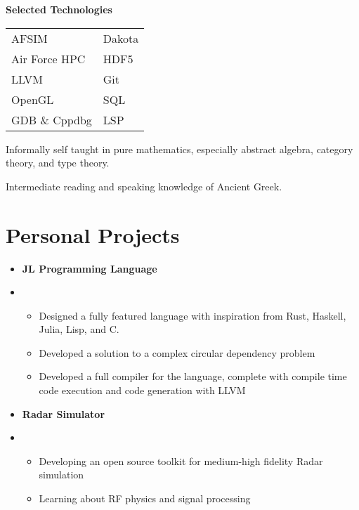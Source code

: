 \documentclass[10pt]{article}
\begin{document}
\begin{paracol}{2}
{        \begin{center}
            \textbf{Selected Technologies}
        \end{center}
        \begin{tabularx}{\linewidth}{YY}
            AFSIM                   & Dakota \\
            Air Force HPC           & HDF5   \\
            LLVM                    & Git    \\
            OpenGL                  & SQL    \\
            GDB           \& Cppdbg & LSP
        \end{tabularx}

        \medskip

        Informally self taught in pure mathematics, especially abstract algebra,
        category theory, and type theory.

        Intermediate reading and speaking knowledge of Ancient Greek.
    }

    \section*{Personal Projects}
    \parbox[top][][c]{\linewidth}{
        \begin{itemize}
            \item[] \textbf{JL Programming Language}
            \item[] \begin{itemize}
                    \item Designed a fully featured language with inspiration from Rust, Haskell, Julia, Lisp, and C.
                    \item Developed a solution to a complex circular dependency problem
                    \item Developed a full compiler for the language, complete with compile time code execution and code generation with LLVM
                \end{itemize}
            \item[] \textbf{Radar Simulator}
            \item[] \begin{itemize}
                    \item Developing an open source toolkit for medium-high fidelity Radar simulation
                    \item Learning about RF physics and signal processing
                \end{itemize}
        \end{itemize}
    }


\end{paracol}
\end{document}
